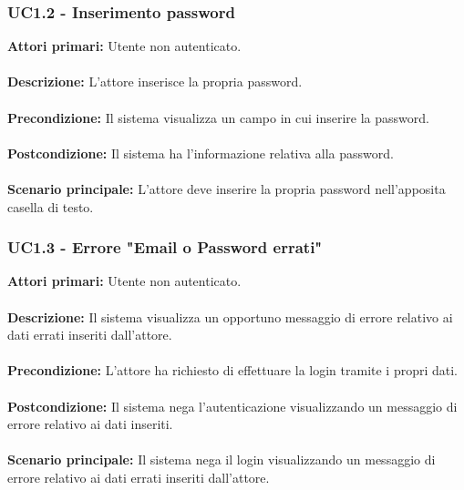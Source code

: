 \subsubsection{UC1.2 - Inserimento password}
    \label{UC1.2}
    \textbf{Attori primari:} Utente non autenticato.
    \\
    \\
    \textbf{Descrizione:} L'attore inserisce la propria password.
    \\
    \\
    \textbf{Precondizione:} Il sistema visualizza un campo in cui inserire la password.
    \\
    \\
    \textbf{Postcondizione:} Il sistema ha l'informazione relativa alla password.
    \\
    \\
    \textbf{Scenario principale:} L'attore deve inserire la propria password nell'apposita casella di testo.
    
    
    \subsubsection{UC1.3 - Errore "Email o Password errati"}
    \textbf{Attori primari:} Utente non autenticato.
    \\
    \\
    \textbf{Descrizione:} Il sistema visualizza un opportuno messaggio di errore relativo ai dati errati inseriti dall'attore.
    \\
    \\
    \textbf{Precondizione:} L'attore ha richiesto di effettuare la login tramite i propri dati.
    \\
    \\
    \textbf{Postcondizione:} Il sistema nega l'autenticazione visualizzando un messaggio di errore relativo ai dati inseriti.
    \\
    \\
    \textbf{Scenario principale:} Il sistema nega il login visualizzando un messaggio di errore relativo ai dati errati inseriti dall'attore.
    
    \newpage
